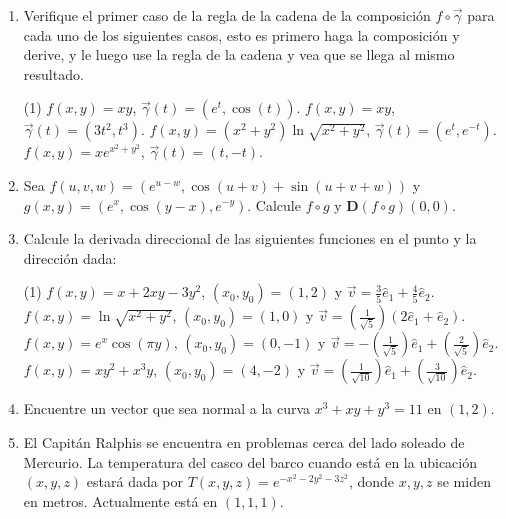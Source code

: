 \documentclass[letterpaper,11pt]{article}
\begin{document}
\begin{enumerate}

\item  Verifique el primer caso de la regla de la cadena de la composición $ f\circ \vec{\gamma}$ para cada uno de los siguientes casos, esto es primero haga la composición y derive, y le luego use la regla de la cadena y vea que se llega al mismo resultado. 

\begin{tasks}(1)
\task $f(x,y) = xy$, $\vec{\gamma}(t) =(e^t, \cos(t)) $.
\task $f(x,y) = xy$, $\vec{\gamma}(t) =(3t^2, t^3) $.
\task $f(x,y) = (x^2 + y^2)\ln{\sqrt{x^2 + y^2}}$, $\vec{\gamma}(t) =(e^t, e^{-t}) $.
\task $f(x,y) = xe^{x^2 + y^2}$, $\vec{\gamma}(t) =(t, -t) $.
\end{tasks}




\item Sea $f(u, v, w) = (e^{u -w}, \cos{(u + v)} + \sin{(u + v + w)})$ y $g(x,y) = (e^{x}, \cos{(y - x)}, e^{-y} )$. Calcule $ f\circ g$ y $\mathbf{D}(f\circ g)(0,0)$.

\item  Calcule la derivada direccional de las siguientes funciones en el punto y la dirección dada: 

\begin{tasks}(1)
\task $f(x,y) = x + 2xy -3y^2$, $(x_0, y_0) = (1,2)$ y $\vec{v} = \frac{3}{5}\hat{e}_1 + \frac{4}{5}\hat{e}_2 $.
\task $f(x,y) = \ln{\sqrt{x^2 + y^2}}$, $(x_0, y_0) = (1,0)$ y $\vec{v} = \left( \frac{1}{\sqrt{5}} \right)(2\hat{e}_1 + \hat{e}_2 )$.
\task $f(x,y) = e^x\cos{(\pi y)}$, $(x_0, y_0) = (0,-1)$ y $\vec{v} = - \left( \frac{1}{\sqrt{5}} \right)\hat{e}_1 +  \left( \frac{2}{\sqrt{5}} \right)\hat{e}_2 $.
\task $f(x,y) = xy^2 + x^3y$, $(x_0, y_0) = (4,-2)$ y $\vec{v} =  \left( \frac{1}{\sqrt{10}} \right)\hat{e}_1 +  \left( \frac{3}{\sqrt{10}} \right)\hat{e}_2 $.
\end{tasks}

\item Encuentre un vector que sea normal a la curva $x^3 + xy + y^3 = 11$ en  $(1,2)$.

\item  El Capitán Ralphis se encuentra en problemas cerca del lado soleado de Mercurio. La temperatura del casco del barco cuando está en la ubicación $(x, y, z)$ estará dada por $T(x,y,z) = e^{-x^2 - 2y^2 - 3z^2}$, donde $x,y,z$ se miden en metros. Actualmente está en $(1,1,1)$.


\end{enumerate}
\end{document}
